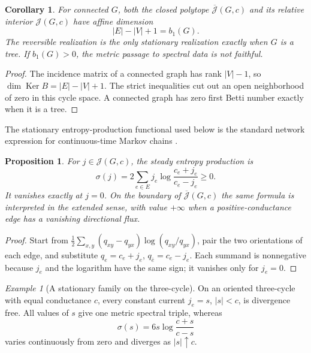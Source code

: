 \documentclass[11pt]{article}
\newtheorem{proposition}[proposition]{Proposition}
\newtheorem{corollary}[corollary]{Corollary}
\theoremstyle{definition}
\theoremstyle{remark}
\newtheorem{example}[example]{Example}
\theoremstyle{definition}
\theoremstyle{remark}
\newcommand{\Ker}{\operatorname{Ker}}
\begin{document}
\begin{corollary}
\label{cor:supp-fibre-dimension}
For connected $G$, both the closed polytope
$\overline{\mathcal J}(G,c)$ and its relative interior $\mathcal J(G,c)$ have affine
dimension
\begin{equation}
 {|E|-|V|+1=b_1(G).}
 \label{eq:supp-fibre-dimension}
\end{equation}
The reversible realization is the only stationary realization exactly when $G$
is a tree.  If
$b_1(G)>0$, the metric passage to spectral data is not faithful.
\end{corollary}

\begin{proof}
The incidence matrix of a connected graph has rank $|V|-1$, so
$\dim\Ker B=|E|-|V|+1$.  The strict inequalities cut out an open neighborhood
of zero in this cycle space.  A connected graph has zero first Betti number
exactly when it is a tree.
\end{proof}

The stationary entropy-production functional used below is the standard
network expression for continuous-time Markov chains
\cite{Schnakenberg1976}.

\begin{proposition}
\label{prop:supp-entropy}
For $j\in\mathcal J(G,c)$, the steady entropy production is
\begin{equation}
 {
 \sigma(j)
 =2\sum_{e\in E}j_e
   \log\frac{c_e+j_e}{c_e-j_e}\ge0.}
 \label{eq:supp-entropy}
\end{equation}
It vanishes exactly at $j=0$.  On the boundary of
$\overline{\mathcal J}(G,c)$ the same formula is interpreted in the extended sense,
with value $+\infty$ when a positive-conductance edge has a vanishing directional
flux.
\end{proposition}

\begin{proof}
Start from
$\frac12\sum_{x,y}(q_{xy}-q_{yx})\log(q_{xy}/q_{yx})$, pair the two
orientations of each edge, and substitute $q_e=c_e+j_e$,
$q_{\bar e}=c_e-j_e$.  Each summand is nonnegative because $j_e$ and the
logarithm have the same sign; it vanishes only for $j_e=0$.
\end{proof}

\begin{example}[A stationary family on the three-cycle]
On an oriented three-cycle with equal conductance $c$, every constant current
$j_e=s$, $|s|<c$, is divergence free.  All values of $s$ give one metric
spectral triple, whereas
\[
 \sigma(s)=6s\log\frac{c+s}{c-s}
\]
varies continuously from zero and diverges as $|s|\uparrow c$.
\end{example}
\end{document}
